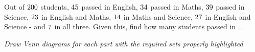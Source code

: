 

\EXPR[0]\eorm{\ve + \vm - \vx}
\EXPR[0]\mors{\vm + \vs - \vy}

\EXPR[0]\prta{\eorm - \vz - \vy + \vp}
\SUBTRACT\vy\vp\prtb
\EXPR[0]\prtc{\vm-\vx-\vy+\vp}
\EXPR[0]

\question Out of $200$ students, $45$ passed in English, $34$ passed in Maths, $39$ passed in Science, 
$23$ in English and Maths, $14$ in Maths and Science, $27$ in English and Science - and $7$ in all three. 
Given this, find how many students passed in $\ldots$

\textit{Draw Venn diagrams for each part with the required sets properly highlighted}

